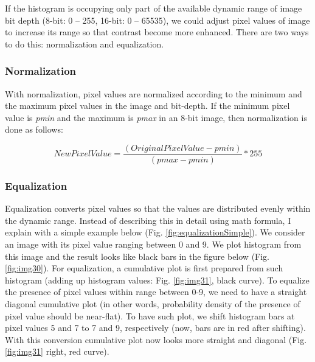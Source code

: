 If the histogram is occupying only part of the available dynamic range
of image bit depth (8-bit: 0 -- 255, 16-bit: 0 -- 65535), we could
adjust pixel values of image to increase its range so that contrast become more
enhanced. There are two ways to do this: normalization and
equalization. 

\subsubsection{Normalization}

With normalization, pixel values are normalized according to the
minimum and the maximum pixel values in the image and bit-depth. If the minimum pixel value is
\textit{pmin} and the maximum is \textit{pmax} in an 8-bit image, then normalization is done as follows:

\begin{equation*}
\mathit{NewPixelValue}=\frac{(\mathit{OriginalPixelValue}-\mathit{pmin})}{(\mathit{pmax}-\mathit{pmin})}\ast
255
\end{equation*}

\subsubsection{Equalization}

Equalization converts pixel values so that the values are distributed
evenly within the dynamic range. Instead of describing this in detail
using math formula, I explain with a simple example below (Fig. \ref{fig:equalizationSimple}). 
We consider an image with its pixel value ranging
between 0 and 9. We plot histogram from this image and the result looks
like black bars in the figure below (Fig. \ref{fig:img30}). For equalization, a cumulative
plot is first prepared from such histogram (adding up histogram values:
Fig. \ref{fig:img31}, black curve). To equalize the presence of pixel values
within range between 0-9, we need to have a straight diagonal
cumulative plot (in other words, probability density of the presence of
pixel value should be near-flat). To have such plot, we shift histogram
bars at pixel values 5 and 7 to 7 and 9, respectively (now, bars are in
red after shifting). With this conversion cumulative plot now looks
more straight and diagonal (Fig. \ref{fig:img31} right, red curve).


